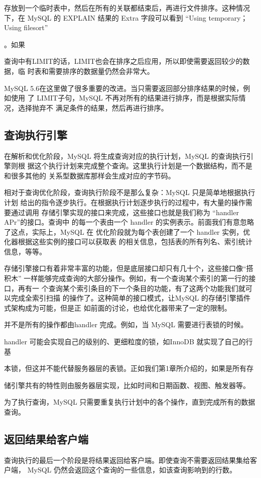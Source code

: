 存放到一个临时表中，然后在所有的关联都结束后，再进行文件排序。这种情况下，在
MySQL 的 EXPLAIN 结果的 Extra 字段可以看到 “Using temporary； Using filesort”

。如果

查询中有LIMIT的话，LIMIT也会在排序之后应用，所以即使需要返回较少的数据，临
时表和需要排序的数据量仍然会非常大。

MySQL 5.6在这里做了很多重要的改进。当只需要返回部分排序结果的时候，例如使用
了 LIMIT子句，MySQL 不再对所有的结果进行排序，而是根据实际情况，选择抛弃不
满足条件的结果，然后再进行排序。

\subsection{查询执行引擎}
在解析和优化阶段，MySQL 将生成查询对应的执行计划，MySQL 的查询执行引擎则根
据这个执行计划来完成整个查询。这里执行计划是一个数据结构，而不是和很多其他的
关系型数据库那样会生成对应的字节码。

相对于查询优化阶段，查询执行阶段不是那么复杂：MySQL 只是简单地根据执行计划
给出的指令逐步执行。在根据执行计划逐步执行的过程中，有大量的操作需要通过调用
存储引擎实现的接口来完成，这些接口也就是我们称为 “handler APr”的接口。查询中
的每一个表由一个 handler 的实例表示。前面我们有意忽略了这点，实际上，MySQL 在
优化阶段就为每个表创建了一个 handler 实例，优化器根据这些实例的接口可以获取表
的相关信息，包括表的所有列名、索引统计信息，等等。

存储引擎接口有着非常丰富的功能，但是底层接口却只有几十个，这些接口像“搭积木”
一样能够完成查询的大部分操作。例如，有一个查询某个索引的第一行的接口，再有一
个查询某个索引条目的下一个条目的功能，有了这两个功能我们就可以完成全索引扫描
的操作了。这种简单的接口模式，让MySQL 的存储引擎插件式架构成为可能，但是正
如前面的讨论，也给优化器带来了一定的限制。

并不是所有的操作都由handler 完成。例如，当 MySQL 需要进行表锁的时候。

handler 可能会实现自己的级别的、更细粒度的锁，如InnoDB 就实现了自己的行基

本锁，但这并不能代替服务器层的表锁。正如我们第1章所介绍的，如果是所有存

储引擎共有的特性则由服务器层实现，比如时间和日期函数、视图、触发器等。

为了执行查询，MySQL 只需要重复执行计划中的各个操作，直到完成所有的数据查询。
\subsection{返回结果给客户端}
查询执行的最后一个阶段是将结果返回给客户端。即使查询不需要返回结果集给客户端，
MySQL 仍然会返回这个查询的一些信息，如该查询影响到的行数。

